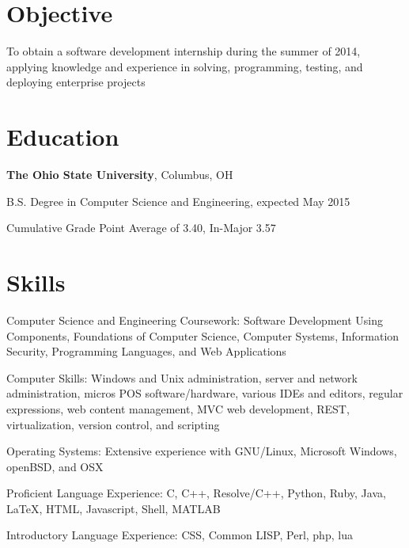 \documentclass[letterpaper]{resume}
\begin{document}
\author{Christopher John Wallace}
\maketitle

\section{Objective}
\begin{compactitem}
\item
	To obtain a software development internship during the summer of 2014, applying
	knowledge and experience in solving, programming, testing, and
	deploying enterprise projects
\end{compactitem}

\section{Education}
\textbf{The Ohio State University}, Columbus, OH

\begin{compactitem}
\item B.S. Degree in Computer Science and Engineering, expected May 2015
\item Cumulative Grade Point Average of 3.40, In-Major 3.57
\end{compactitem}

\section{Skills}

\begin{compactitem}
\item
	Computer Science and Engineering Coursework:
	Software Development Using Components, Foundations of Computer Science,
	Computer Systems, Information Security, Programming Languages,
	and Web Applications

\item
	Computer Skills: Windows and Unix administration, server and network
	administration, micros POS software/hardware, various IDEs and editors,
	regular expressions, web content management, MVC web development,
	REST, virtualization, version control, and scripting

\item
	Operating Systems: Extensive experience with GNU/Linux,
	Microsoft Windows, openBSD, and OSX

\item
	Proficient Language Experience: C, C++, Resolve/C++, Python, Ruby, Java,
	\LaTeX, HTML, Javascript, Shell, MATLAB
\item
	Introductory Language Experience: CSS, Common LISP, Perl, php, lua

\end{compactitem}
\end{document}
